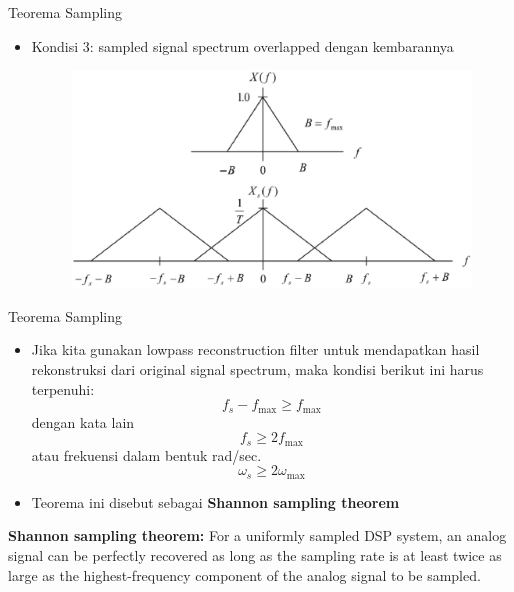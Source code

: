\documentclass[pdflatex,compress,mathserif]{beamer}
\begin{document}
\begin{frame}{Teorema Sampling}
    \begin{itemize}
        \item Kondisi 3: sampled signal spectrum overlapped dengan kembarannya
        \begin{figure}
            \includegraphics[width=\linewidth]{./img/img11}
        \end{figure}
    \end{itemize}
\end{frame}

\begin{frame}{Teorema Sampling}
    \begin{itemize}
        \item Jika kita gunakan lowpass reconstruction filter untuk mendapatkan hasil rekonstruksi dari original signal spectrum, maka kondisi berikut ini harus terpenuhi:
        \begin{equation}
            f_s - f_{\text{max}} \geq f_{\text{max}}
        \end{equation}
        dengan kata lain
        \begin{equation}
            f_s \geq 2f_{\text{max}}
            \label{eq:freq_nyquist}
        \end{equation}
        atau frekuensi dalam bentuk rad/sec.
        \begin{equation}
            \omega_s \geq 2\omega_{\text{max}}
        \end{equation}
        \item Teorema ini disebut sebagai \textbf{Shannon sampling theorem}
    \end{itemize} 
\end{frame}

\begin{frame}
    \begin{theorem}{\textbf{Shannon sampling theorem:}}
        For a uniformly sampled DSP system, an analog signal can be perfectly recovered as long as the sampling rate is at least twice as large as the highest-frequency component of the analog signal to be sampled.
    \end{theorem}
\end{frame}
\end{document}
